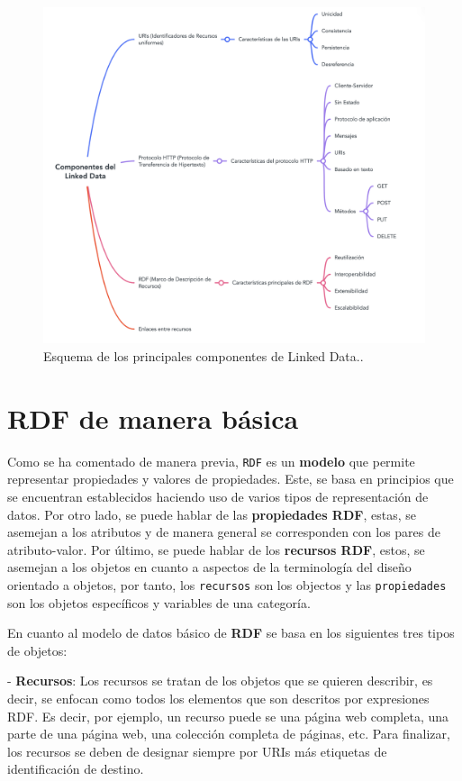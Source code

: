 \documentclass[11pt]{report}
\begin{document}
\begin{figure}[H]
	\centering
	\includegraphics[scale=0.6]{../img/Componentes-Linked-Data.png}
	\caption{Esquema de los principales componentes de Linked Data..}
	\label{fig:Componentes-Linked-Data}
\end{figure}

	\chapter{RDF de manera básica}
  Como se ha comentado de manera previa, \texttt{RDF} es un \textbf{modelo} que permite representar propiedades y valores de propiedades. Este, se basa en principios que se encuentran establecidos haciendo uso de varios tipos de representación de datos. Por otro lado, se puede hablar de las \textbf{propiedades RDF}, estas, se asemejan a los atributos y de manera general se corresponden con los pares de atributo-valor. Por último, se puede hablar de los \textbf{recursos RDF}, estos, se asemejan a los objetos en cuanto a aspectos de la terminología del diseño orientado a objetos, por tanto, los \texttt{recursos} son los objectos y las \texttt{propiedades} son los objetos específicos y variables de una categoría.

	En cuanto al modelo de datos básico de \textbf{RDF} se basa en los siguientes tres tipos de objetos:

	- \textbf{Recursos}: Los recursos se tratan de los objetos que se quieren describir, es decir, se enfocan como todos los elementos que son descritos por expresiones RDF. Es decir, por ejemplo, un recurso puede se una página web completa, una parte de una página web, una colección completa de páginas, etc. Para finalizar, los recursos se deben de designar siempre por URIs más etiquetas de identificación de destino.
\end{document}
